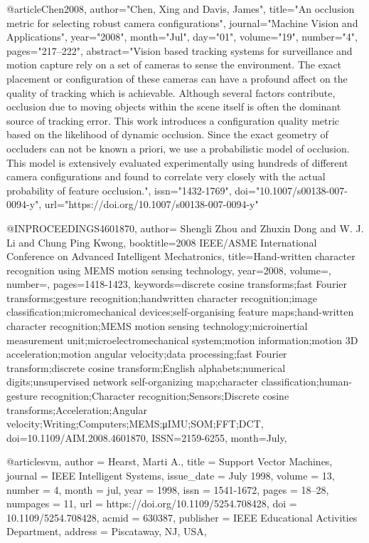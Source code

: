 @article{Chen2008,
author="Chen, Xing
and Davis, James",
title="An occlusion metric for selecting robust camera configurations",
journal="Machine Vision and Applications",
year="2008",
month="Jul",
day="01",
volume="19",
number="4",
pages="217--222",
abstract="Vision based tracking systems for surveillance and motion capture rely on a set of cameras to sense the environment. The exact placement or configuration of these cameras can have a profound affect on the quality of tracking which is achievable. Although several factors contribute, occlusion due to moving objects within the scene itself is often the dominant source of tracking error. This work introduces a configuration quality metric based on the likelihood of dynamic occlusion. Since the exact geometry of occluders can not be known a priori, we use a probabilistic model of occlusion. This model is extensively evaluated experimentally using hundreds of different camera configurations and found to correlate very closely with the actual probability of feature occlusion.",
issn="1432-1769",
doi="10.1007/s00138-007-0094-y",
url="https://doi.org/10.1007/s00138-007-0094-y"
}


@INPROCEEDINGS{4601870,
author={ {Shengli Zhou} and {Zhuxin Dong} and W. J. {Li} and {Chung Ping Kwong}},
booktitle={2008 IEEE/ASME International Conference on Advanced Intelligent Mechatronics},
title={Hand-written character recognition using MEMS motion sensing technology},
year={2008},
volume={},
number={},
pages={1418-1423},
keywords={discrete cosine transforms;fast Fourier transforms;gesture recognition;handwritten character recognition;image classification;micromechanical devices;self-organising feature maps;hand-written character recognition;MEMS motion sensing technology;microinertial measurement unit;microelectromechanical system;motion information;motion 3D acceleration;motion angular velocity;data processing;fast Fourier transform;discrete cosine transform;English alphabets;numerical digits;unsupervised network self-organizing map;character classification;human-gesture recognition;Character recognition;Sensors;Discrete cosine transforms;Acceleration;Angular velocity;Writing;Computers;MEMS;μIMU;SOM;FFT;DCT},
doi={10.1109/AIM.2008.4601870},
ISSN={2159-6255},
month={July},}


@article{svm,
 author = {Hearst, Marti A.},
 title = {Support Vector Machines},
 journal = {IEEE Intelligent Systems},
 issue_date = {July 1998},
 volume = {13},
 number = {4},
 month = jul,
 year = {1998},
 issn = {1541-1672},
 pages = {18--28},
 numpages = {11},
 url = {https://doi.org/10.1109/5254.708428},
 doi = {10.1109/5254.708428},
 acmid = {630387},
 publisher = {IEEE Educational Activities Department},
 address = {Piscataway, NJ, USA},
}

